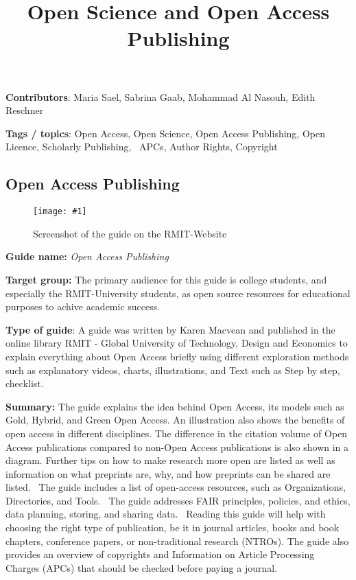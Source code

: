 \documentclass{article}
\newlength{\imgwidth}
\newcommand\scaledgraphics[2]{%
                
\settowidth{\imgwidth}{\texttt{[image: \#1]}}%
                
\setlength{\imgwidth}{\minof{\imgwidth}{#2\textwidth}}%
                
\texttt{[image: \#1]}%
                
}
\begin{document}
\title{Open Science and Open Access Publishing }

\maketitle


\textbf{Contributors}: Maria Sael, Sabrina Gaab, Mohammad Al Nasouh, Edith Reschner


\textbf{Tags / topics}: Open Access, Open Science, Open Access Publishing, Open Licence, Scholarly Publishing,  APCs, Author Rights, Copyright


\subsection{Open Access Publishing}\label{H7151279}



\begin{center}
\begin{figure}
\scaledgraphics{dec17709-06cd-4c04-b217-1e1f0b7a42cc.png}{0.75}
\caption*{Screenshot of the guide on the RMIT-Website}\label{F16639041}
\end{figure}


\end{center}


\textbf{Guide name:} \emph{Open Access Publishing} \autocite{macvean_all_2021} 


\textbf{Target group: }The primary audience for this guide is college students, and especially the RMIT-University students, as open source resources for educational purposes to achive academic success.


\textbf{Type of guide}: A guide was written by Karen Macvean and published in the online library RMIT - Global University of Technology, Design and Economics to explain everything about Open Access briefly using different exploration methods such as explanatory videos, charts, illustrations, and Text such as Step by step, checklist. 


\textbf{Summary:} The guide explains the idea behind Open Access, its models such as Gold, Hybrid, and Green Open Access. An illustration also shows the benefits of open access in different disciplines. The difference in the citation volume of Open Access publications compared to non-Open Access publications is also shown in a diagram. Further tips on how to make research more open are listed as well as information on what preprints are, why, and how preprints can be shared are listed.  The guide includes a list of open-access resources, such as Organizations, Directories, and Tools.  The guide addresses FAIR principles, policies, and ethics, data planning, storing, and sharing data.  Reading this guide will help with choosing the right type of publication, be it in journal articles, books and book chapters, conference papers, or non-traditional research (NTROs). The guide also provides an overview of copyrights and Information on Article Processing Charges (APCs) that should be checked before paying a journal.
\end{document}
